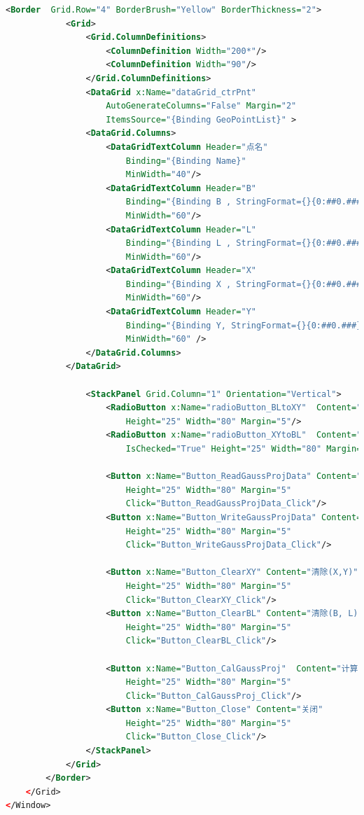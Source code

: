 \begin{lstlisting}[language=xml]
        <Border  Grid.Row="4" BorderBrush="Yellow" BorderThickness="2">
            <Grid>
                <Grid.ColumnDefinitions>
                    <ColumnDefinition Width="200*"/>
                    <ColumnDefinition Width="90"/>
                </Grid.ColumnDefinitions>
                <DataGrid x:Name="dataGrid_ctrPnt" 
                    AutoGenerateColumns="False" Margin="2" 
                    ItemsSource="{Binding GeoPointList}" >
                <DataGrid.Columns>
                    <DataGridTextColumn Header="点名" 
                        Binding="{Binding Name}"
                        MinWidth="40"/>
                    <DataGridTextColumn Header="B" 
                        Binding="{Binding B , StringFormat={}{0:##0.####}}" 
                        MinWidth="60"/>
                    <DataGridTextColumn Header="L" 
                        Binding="{Binding L , StringFormat={}{0:##0.####}}" 
                        MinWidth="60"/>
                    <DataGridTextColumn Header="X" 
                        Binding="{Binding X , StringFormat={}{0:##0.###}}" 
                        MinWidth="60"/>
                    <DataGridTextColumn Header="Y" 
                        Binding="{Binding Y, StringFormat={}{0:##0.###}}"
                        MinWidth="60" />
                </DataGrid.Columns>
            </DataGrid>

                <StackPanel Grid.Column="1" Orientation="Vertical">
                    <RadioButton x:Name="radioButton_BLtoXY"  Content="正算" 
                        Height="25" Width="80" Margin="5"/>
                    <RadioButton x:Name="radioButton_XYtoBL"  Content="反算" 
                        IsChecked="True" Height="25" Width="80" Margin="5" />

                    <Button x:Name="Button_ReadGaussProjData" Content="读入数据"
                        Height="25" Width="80" Margin="5" 
                        Click="Button_ReadGaussProjData_Click"/>
                    <Button x:Name="Button_WriteGaussProjData" Content="写出数据" 
                        Height="25" Width="80" Margin="5" 
                        Click="Button_WriteGaussProjData_Click"/>

                    <Button x:Name="Button_ClearXY" Content="清除(X,Y)" 
                        Height="25" Width="80" Margin="5" 
                        Click="Button_ClearXY_Click"/>
                    <Button x:Name="Button_ClearBL" Content="清除(B, L)" 
                        Height="25" Width="80" Margin="5" 
                        Click="Button_ClearBL_Click"/>
                    
                    <Button x:Name="Button_CalGaussProj"  Content="计算" 
                        Height="25" Width="80" Margin="5" 
                        Click="Button_CalGaussProj_Click"/>
                    <Button x:Name="Button_Close" Content="关闭" 
                        Height="25" Width="80" Margin="5" 
                        Click="Button_Close_Click"/>
                </StackPanel>
            </Grid>
        </Border>     
    </Grid>
</Window>
\end{lstlisting}

